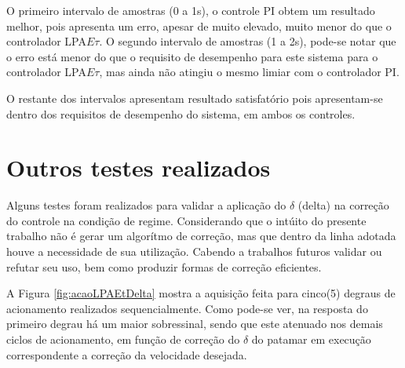 O primeiro intervalo de amostras (0 a 1s),
o controle PI obtem um resultado melhor,
pois apresenta um erro,
apesar de muito elevado,
muito menor do que o controlador LPA$E\tau$.
O segundo intervalo de amostras (1 a 2s),
pode-se notar que o erro está menor do que o
requisito de desempenho para este sistema
para o controlador LPA$E\tau$,
mas ainda não atingiu o mesmo limiar com
o controlador PI.  

O restante dos intervalos apresentam resultado satisfatório pois
apresentam-se dentro dos requisitos de desempenho do sistema, em ambos
os controles.




















\section{Outros testes realizados}

Alguns testes foram realizados para validar a aplicação do $\delta$
(delta) na correção do controle na condição de regime.
Considerando que o intúito do presente trabalho não é gerar um
algorítmo de correção, mas que dentro da linha adotada houve a
necessidade de sua utilização. Cabendo a trabalhos futuros validar ou
refutar seu uso, bem como produzir formas de correção eficientes. 

A Figura \ref{fig:acaoLPAEtDelta} mostra a aquisição feita para
cinco(5) degraus de acionamento realizados sequencialmente.
Como pode-se ver, na resposta do primeiro degrau há um maior
sobressinal, sendo que este atenuado nos demais ciclos de acionamento,
em função de correção do $\delta$ do patamar em execução
correspondente a correção da velocidade desejada.

